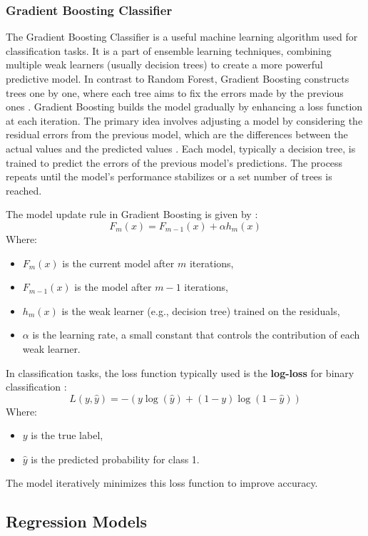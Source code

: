 \documentclass[12pt, a4paper,oneside]{book}
\numberwithin{equation}{section}
\begin{document}
\subsubsection{Gradient Boosting Classifier}

The Gradient Boosting Classifier is a useful machine learning algorithm used for classification tasks.  It is a part of ensemble learning techniques, combining multiple weak learners (usually decision trees) to create a more powerful predictive model. In contrast to Random Forest, Gradient Boosting constructs trees one by one, where each tree aims to fix the errors made by the previous ones \cite{friedman2001}. Gradient Boosting builds the model gradually by enhancing a loss function at each iteration. The primary idea involves adjusting a model by considering the residual errors from the previous model, which are the differences between the actual values and the predicted values \cite{chen2016}. Each model, typically a decision tree, is trained to predict the errors of the previous model's predictions. The process repeats until the model's performance stabilizes or a set number of trees is reached.

The model update rule in Gradient Boosting is given by \cite{guest2024}:
\[F_m(x) = F_{m-1}(x) + \alpha h_m(x)\]
Where:
\begin{itemize}
    \item \( F_m(x) \) is the current model after \( m \) iterations,
    \item \( F_{m-1}(x) \) is the model after \( m-1 \) iterations,
    \item \( h_m(x) \) is the weak learner (e.g., decision tree) trained on the residuals,
    \item \( \alpha \) is the learning rate, a small constant that controls the contribution of each weak learner.
\end{itemize}
In classification tasks, the loss function typically used is the \textbf{log-loss} for binary classification \cite{guest2024}:
\[L(y, \hat{y}) = - \left( y \log(\hat{y}) + (1 - y) \log(1 - \hat{y}) \right)\]
Where:
\begin{itemize}
    \item \( y \) is the true label,
    \item \( \hat{y} \) is the predicted probability for class 1.
\end{itemize}

The model iteratively minimizes this loss function to improve accuracy.

\subsection{Regression Models}
\end{document}
